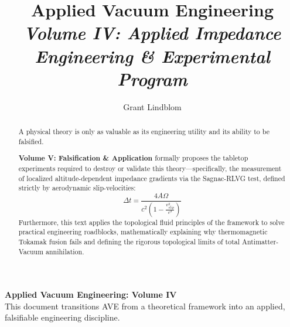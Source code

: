 \title{\textbf{Applied Vacuum Engineering} \\ \large \textit{Volume IV: Applied Impedance Engineering \& Experimental Program}}
\author{Grant Lindblom}
\date{}

\maketitle

\vfill
\noindent\textbf{Applied Vacuum Engineering: Volume IV} \\
This document transitions AVE from a theoretical framework into an applied, falsifiable engineering discipline.

\begin{abstract}
    A physical theory is only as valuable as its engineering utility and its ability to be falsified.
    
    \textbf{Volume V: Falsification \& Application} formally proposes the tabletop experiments required to destroy or validate this theory—specifically, the measurement of localized altitude-dependent impedance gradients via the Sagnac-RLVG test, defined strictly by aerodynamic slip-velocities:
    \begin{equation}
        \Delta t = \frac{4 A \Omega}{c^2 (1 - \frac{v_{slip}^2}{c^2})}
    \end{equation}
    Furthermore, this text applies the topological fluid principles of the framework to solve practical engineering roadblocks, mathematically explaining why thermomagnetic Tokamak fusion fails and defining the rigorous topological limits of total Antimatter-Vacuum annihilation.
\end{abstract}
